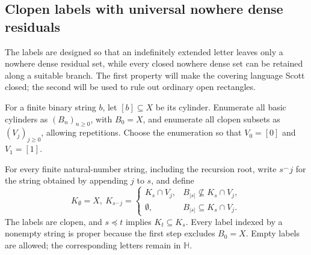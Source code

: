 \documentclass[10pt,a4paper]{article}
\theoremstyle{definition}
\newcommand{\HH}{\mathbb H}
\begin{document}
\subsection{Clopen labels with universal nowhere dense residuals}\label{word:subsec:labels}
The labels are designed so that an indefinitely extended letter leaves only a nowhere dense residual set, while every closed nowhere dense set can be retained along a suitable branch. The first property will make the covering language Scott closed; the second will be used to rule out ordinary open rectangles.

For a finite binary string $b$, let $[b]\subseteq X$ be its cylinder. Enumerate all basic cylinders as $(B_n)_{n\geq0}$, with $B_0=X$, and enumerate all clopen subsets as $(V_j)_{j\geq0}$, allowing repetitions. Choose the enumeration so that $V_0=[0]$ and $V_1=[1]$.

For every finite natural-number string, including the recursion root, write $s^\frown j$ for the string obtained by appending $j$ to $s$, and define
\begin{equation}\label{word:eq:labels}
 K_\emptyset=X,
 ~
 K_{s^\frown j}=\begin{cases}
 K_s\cap V_j,&B_{|s|}\not\subseteq K_s\cap V_j,\\
 \emptyset,&B_{|s|}\subseteq K_s\cap V_j.
 \end{cases}
\end{equation}
The labels are clopen, and $s\preceq t$ implies $K_t\subseteq K_s$. Every label indexed by a nonempty string is proper because the first step excludes $B_0=X$. Empty labels are allowed; the corresponding letters remain in $\HH$.
\end{document}
